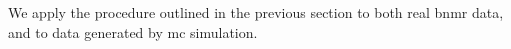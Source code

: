 \begin{comment}
    We could probably do the stats test with real data too. Just pick something that we know the functional form doesn't change, and see if there are large differences 
    in the resulting distributions. Even better if these are repeat measurements at the same settings.  

Figure list: 

    For one run: 
    1. Real SLR data + ILT fit function + normal fit function
    2. ILT probability distribution
    3. L curve
    4. The other diagnostic curves (or maybe just one, the most useful?)
    6. A plots showing the signature of: (a) strexp (b) const offset
    5. A couple of summary plots showing the goodness of fit (somehow, see above for options other than chisq) as a function of (a) function (b) spacing for biexp (c) noise level
    
    Probably topping out at 8 figures or something. It will be long perhaps. 
    

\end{comment}

We apply the procedure outlined in the previous section to both real \gls{bnmr} data, and to data generated by \gls{mc} simulation. 



